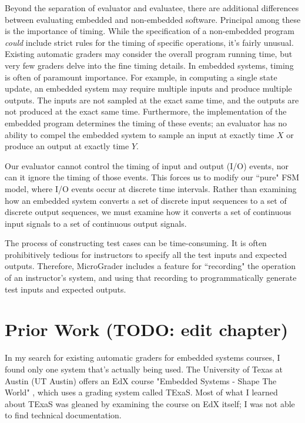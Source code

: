\documentclass[12pt]{article}
\begin{document}
Beyond the separation of evaluator and evaluatee, there are additional differences between evaluating embedded and non-embedded software.  Principal among these is the importance of timing.  While the specification of a non-embedded program \textit{could} include strict rules for the timing of specific operations, it's fairly unusual.  Existing automatic graders may consider the overall program running time, but very few graders delve into the fine timing details. In embedded systems, timing is often of paramount importance.  For example, in computing a single state update, an embedded system may require multiple inputs and produce multiple outputs.  The inputs are not sampled at the exact same time, and the outputs are not produced at the exact same time.  Furthermore, the implementation of the embedded program determines the timing of these events; an evaluator has no ability to compel the embedded system to sample an input at exactly time $X$ or produce an output at exactly time $Y$.

Our evaluator cannot control the timing of input and output (I/O) events, nor can it ignore the timing of those events.  This forces us to modify our ``pure" FSM model, where I/O events occur at discrete time intervals.  Rather than examining how an embedded system converts a set of discrete input sequences to a set of discrete output sequences, we must examine how it converts a set of continuous input signals to a set of continuous output signals.

The process of constructing test cases can be time-consuming.  It is often prohibitively tedious for instructors to specify all the test inputs and expected outputs.  Therefore, MicroGrader includes a feature for ``recording" the operation of an instructor's system, and using that recording to programmatically generate test inputs and expected outputs. 


\newpage
\section{Prior Work (TODO: edit chapter)}
In my search for existing automatic graders for embedded systems courses, I found only one system that's actually being used.  The University of Texas at Austin (UT Austin) offers an EdX course "Embedded Systems - Shape The World" \cite{ut-austin-edx}, which uses a grading system called TExaS.  Most of what I learned about TExaS was gleaned by examining the course on EdX itself; I was not able to find technical documentation.
\end{document}
